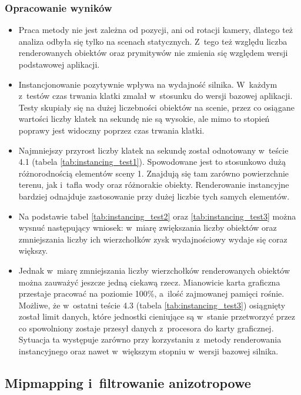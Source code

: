 \documentclass[a4paper,twoside,12pt]{book}
\begin{document}
\subsubsection{Opracowanie wyników}
\begin{itemize}
    \item Praca metody nie jest zależna od pozycji, ani od rotacji kamery, dlatego też analiza odbyła się tylko na scenach statycznych. Z~tego też względu liczba renderowanych obiektów oraz prymitywów nie zmienia się względem wersji podstawowej aplikacji.
    \item Instancjonowanie pozytywnie wpływa na wydajność silnika. W~każdym z~testów czas trwania klatki zmalał w~stosunku do wersji bazowej aplikacji. Testy skupiały się na dużej liczebności obiektów na scenie, przez co osiągane wartości liczby klatek na sekundę nie są wysokie, ale mimo to stopień poprawy jest widoczny poprzez czas trwania klatki.
    \item Najmniejszy przyrost liczby klatek na sekundę został odnotowany w~teście 4.1 (tabela \ref{tab:instancing_test1}). Spowodowane jest to stosunkowo dużą różnorodnością elementów sceny 1. Znajdują się tam zarówno powierzchnie terenu, jak i~tafla wody oraz różnorakie obiekty. Renderowanie instancyjne bardziej odnajduje zastosowanie przy dużej liczbie tych samych elementów.
    \item Na podstawie tabel \ref{tab:instancing_test2} oraz \ref{tab:instancing_test3} można wysnuć następujący wniosek: w~miarę zwiększania liczby obiektów oraz zmniejszania liczby ich wierzchołków zysk wydajnościowy wydaje się coraz większy.
    \item Jednak w~miarę zmniejszania liczby wierzchołków renderowanych obiektów można zauważyć jeszcze jedną ciekawą rzecz. Mianowicie karta graficzna przestaje pracować na poziomie 100\%, a~ilość zajmowanej pamięci rośnie. Możliwe, że w~ostatni teście 4.3 (tabela \ref{tab:instancing_test3}) osiągnięty został limit danych, które jednostki cieniujące są w~stanie przetworzyć przez co spowolniony zostaje przesył danych z~procesora do karty graficznej. Sytuacja ta występuje zarówno przy korzystaniu z~metody renderowania instancyjnego oraz nawet w~większym stopniu w~wersji bazowej silnika.
\end{itemize}



\subsection{Mipmapping i~filtrowanie anizotropowe}
\end{document}
